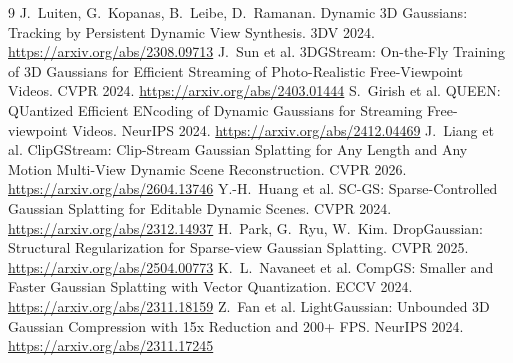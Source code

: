 \documentclass[11pt]{article}
\begin{document}
\begin{thebibliography}{9}\small
{} J.~Luiten, G.~Kopanas, B.~Leibe, D.~Ramanan. Dynamic 3D Gaussians: Tracking by Persistent Dynamic View Synthesis. 3DV 2024. \url{https://arxiv.org/abs/2308.09713}
 J.~Sun et al. 3DGStream: On-the-Fly Training of 3D Gaussians for Efficient Streaming of Photo-Realistic Free-Viewpoint Videos. CVPR 2024. \url{https://arxiv.org/abs/2403.01444}
 S.~Girish et al. QUEEN: QUantized Efficient ENcoding of Dynamic Gaussians for Streaming Free-viewpoint Videos. NeurIPS 2024. \url{https://arxiv.org/abs/2412.04469}
 J.~Liang et al. ClipGStream: Clip-Stream Gaussian Splatting for Any Length and Any Motion Multi-View Dynamic Scene Reconstruction. CVPR 2026. \url{https://arxiv.org/abs/2604.13746}
 Y.-H.~Huang et al. SC-GS: Sparse-Controlled Gaussian Splatting for Editable Dynamic Scenes. CVPR 2024. \url{https://arxiv.org/abs/2312.14937}
 H.~Park, G.~Ryu, W.~Kim. DropGaussian: Structural Regularization for Sparse-view Gaussian Splatting. CVPR 2025. \url{https://arxiv.org/abs/2504.00773}
 K.~L.~Navaneet et al. CompGS: Smaller and Faster Gaussian Splatting with Vector Quantization. ECCV 2024. \url{https://arxiv.org/abs/2311.18159}
 Z.~Fan et al. LightGaussian: Unbounded 3D Gaussian Compression with 15x Reduction and 200+ FPS. NeurIPS 2024. \url{https://arxiv.org/abs/2311.17245}
\end{thebibliography}
\end{document}
